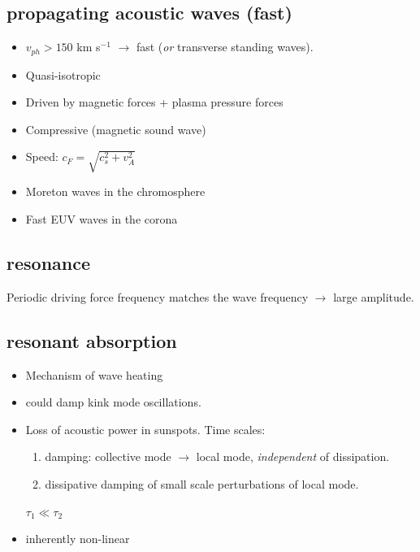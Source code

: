 \documentclass{article}
\begin{document}
\subsection{propagating acoustic waves (fast)}
\begin{itemize}
    \item $v_{ph}>150$ km s$^{-1}$ $\rightarrow$ fast
        (\emph{or} transverse standing waves).
    \item Quasi-isotropic
    \item Driven by magnetic forces + plasma pressure forces
    \item Compressive (magnetic sound wave)
    \item Speed: $c_{F} = \sqrt{c_{s}^2 + v_{A}^2} $
    \item Moreton waves in the chromosphere
    \item Fast EUV waves in the corona
\end{itemize}
\subsection{resonance}
Periodic driving force frequency matches the wave frequency
$\rightarrow$ large amplitude.
\subsection{resonant absorption}
\begin{itemize}
    \item Mechanism of wave heating
    \item could damp kink mode oscillations.
    \item Loss of acoustic power in sunspots. Time scales:
        \begin{enumerate}
            \item damping: collective mode $\rightarrow$ local mode,
                \emph{independent} of dissipation.
            \item dissipative damping of small scale perturbations of local
                mode.
        \end{enumerate}
        $\tau_1 \ll \tau_2$
    \item inherently non-linear
\end{itemize}
\end{document}
